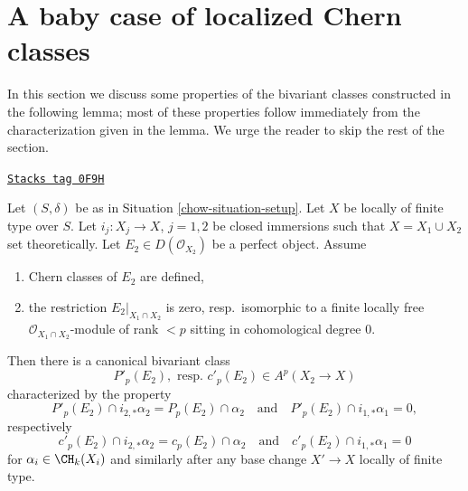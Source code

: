 \section{A baby case of localized Chern classes}
\label{chow-section-preparation-localized-chern}
In this section we discuss some properties of the bivariant classes
constructed in the following lemma; most of these properties follow
immediately from the characterization given in the lemma. We urge the
reader to skip the rest of the section.

\begin{lemma}[Silly]
\label{chow-lemma-silly}
\href{https://stacks.math.columbia.edu/tag/0F9H}{\texttt{Stacks tag 0F9H}}

Let $(S, \delta)$ be as in Situation \ref{chow-situation-setup}. Let $X$ be
locally of finite type over $S$. Let $i_j : X_j \to X$, $j = 1, 2$
be closed immersions such that $X = X_1 \cup X_2$ set theoretically. Let
$E_2 \in D(\mathcal{O}_{X_2})$ be a perfect object. Assume
\begin{enumerate}
\item Chern classes of $E_2$ are defined,
\item the restriction $E_2|_{X_1 \cap X_2}$ is zero,
resp.\ isomorphic to a finite locally free $\mathcal{O}_{X_1 \cap X_2}$-module
of rank $< p$ sitting in cohomological degree $0$.
\end{enumerate}
Then there is a canonical bivariant class
$$
P'_p(E_2),\text{ resp. }c'_p(E_2) \in A^p(X_2 \to X)
$$
characterized by the property
$$
P'_p(E_2) \cap i_{2, *} \alpha_2 = P_p(E_2) \cap \alpha_2
\quad\text{and}\quad
P'_p(E_2) \cap i_{1, *} \alpha_1 = 0,
$$
respectively
$$
c'_p(E_2) \cap i_{2, *} \alpha_2 = c_p(E_2) \cap \alpha_2
\quad\text{and}\quad
c'_p(E_2) \cap i_{1, *} \alpha_1 = 0
$$
for $\alpha_i \in \CH_k(X_i)$ and similarly after any base change
$X' \to X$ locally of finite type.
\end{lemma}

